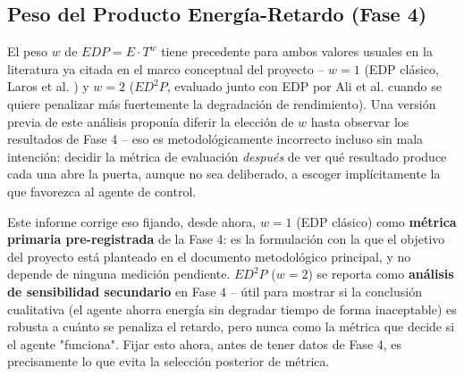 \subsection{Peso del Producto Energía-Retardo (Fase 4)}

El peso $w$ de $EDP = E \cdot T^{w}$ tiene precedente para ambos valores
usuales en la literatura ya citada en el marco conceptual del proyecto --
$w=1$ (EDP clásico, Laros et al. \citep{Laros2013}) y $w=2$ ($ED^2P$,
evaluado junto con EDP por Ali et al. \citep{Ali2023} cuando se quiere
penalizar más fuertemente la degradación de rendimiento). Una versión
previa de este análisis proponía diferir la elección de $w$ hasta observar
los resultados de Fase 4 -- eso es metodológicamente incorrecto incluso sin
mala intención: decidir la métrica de evaluación \emph{después} de ver qué
resultado produce cada una abre la puerta, aunque no sea deliberado, a
escoger implícitamente la que favorezca al agente de control.

Este informe corrige eso fijando, desde ahora, $w=1$ (EDP clásico) como
\textbf{métrica primaria pre-registrada} de la Fase 4: es la formulación
con la que el objetivo del proyecto está planteado en el documento
metodológico principal, y no depende de ninguna medición pendiente. $ED^2P$
($w=2$) se reporta como \textbf{análisis de sensibilidad secundario} en
Fase 4 -- útil para mostrar si la conclusión cualitativa (el agente ahorra
energía sin degradar tiempo de forma inaceptable) es robusta a cuánto se
penaliza el retardo, pero nunca como la métrica que decide si el agente
"funciona". Fijar esto ahora, antes de tener datos de Fase 4, es
precisamente lo que evita la selección posterior de métrica.

